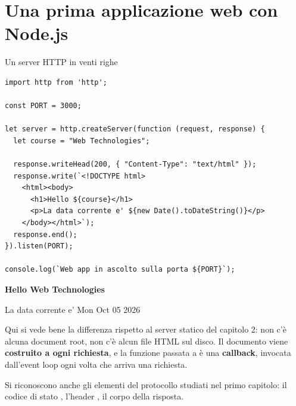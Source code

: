 \section{Una prima applicazione web con Node.js}

\begin{esempio}{Un server HTTP in venti righe}\label{es:server-http}
\begin{affianco}[0.6][c]
\codicepiccolo
\begin{lstlisting}[style=js, name=app.js]
import http from 'http';

const PORT = 3000;

let server = http.createServer(function (request, response) {
  let course = "Web Technologies";

  response.writeHead(200, { "Content-Type": "text/html" });
  response.write(`<!DOCTYPE html>
    <html><body>
      <h1>Hello ${course}</h1>
      <p>La data corrente e' ${new Date().toDateString()}</p>
    </body></html>`);
  response.end();
}).listen(PORT);

console.log(`Web app in ascolto sulla porta ${PORT}`);
\end{lstlisting}
\risultato
\begin{browser}[localhost:3000]
  {\raggedright\Lora\bfseries\LARGE Hello Web Technologies\par}\vspace{6pt}
  La data corrente e' Mon Oct 05 2026
\end{browser}
\begin{immagine}
\end{immagine}
\end{affianco}

Qui si vede bene la differenza rispetto al server statico del capitolo 2: non
c'è alcuna document root, non c'è alcun file HTML sul disco. Il documento viene
\textbf{costruito a ogni richiesta}, e la funzione passata a
 è una \textbf{callback}, invocata dall'event loop ogni volta
che arriva una richiesta.

Si riconoscono anche gli elementi del protocollo studiati nel primo capitolo:
il codice di stato , l'header , il corpo della
risposta.
\end{esempio}

